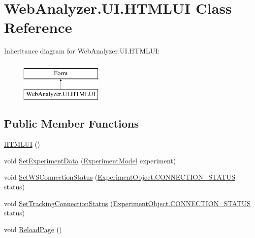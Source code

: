 \hypertarget{class_web_analyzer_1_1_u_i_1_1_h_t_m_l_u_i}{}\section{Web\+Analyzer.\+U\+I.\+H\+T\+M\+L\+U\+I Class Reference}
\label{class_web_analyzer_1_1_u_i_1_1_h_t_m_l_u_i}
Inheritance diagram for Web\+Analyzer.\+U\+I.\+H\+T\+M\+L\+U\+I\+:\begin{figure}[H]
\begin{center}
\leavevmode
\includegraphics[height=2.000000cm]{class_web_analyzer_1_1_u_i_1_1_h_t_m_l_u_i}
\end{center}
\end{figure}
\subsection*{Public Member Functions}
\begin{DoxyCompactItemize}
\item 
\hyperlink{class_web_analyzer_1_1_u_i_1_1_h_t_m_l_u_i_aaaa68b7c3f90ecdd0bf051d1661004a4}{H\+T\+M\+L\+U\+I} ()
\item 
void \hyperlink{class_web_analyzer_1_1_u_i_1_1_h_t_m_l_u_i_ac06665c3130dee5b5d7676b7ea5589d4}{Set\+Experiment\+Data} (\hyperlink{class_web_analyzer_1_1_models_1_1_base_1_1_experiment_model}{Experiment\+Model} experiment)
\item 
void \hyperlink{class_web_analyzer_1_1_u_i_1_1_h_t_m_l_u_i_aceec55dc8dd89be1fcbfa8a7184d3715}{Set\+W\+S\+Connection\+Status} (\hyperlink{class_web_analyzer_1_1_u_i_1_1_interaction_objects_1_1_experiment_object_a2875208b4f4b0ed643593152f4ec025c}{Experiment\+Object.\+C\+O\+N\+N\+E\+C\+T\+I\+O\+N\+\_\+\+S\+T\+A\+T\+U\+S} status)
\item 
void \hyperlink{class_web_analyzer_1_1_u_i_1_1_h_t_m_l_u_i_aa012cb8155f5ab3dfc93b564f8a76faa}{Set\+Tracking\+Connection\+Status} (\hyperlink{class_web_analyzer_1_1_u_i_1_1_interaction_objects_1_1_experiment_object_a2875208b4f4b0ed643593152f4ec025c}{Experiment\+Object.\+C\+O\+N\+N\+E\+C\+T\+I\+O\+N\+\_\+\+S\+T\+A\+T\+U\+S} status)
\item 
void \hyperlink{class_web_analyzer_1_1_u_i_1_1_h_t_m_l_u_i_a32d0bf8581afa8af866438d4ee76dd9f}{Reload\+Page} ()
\end{DoxyCompactItemize}
